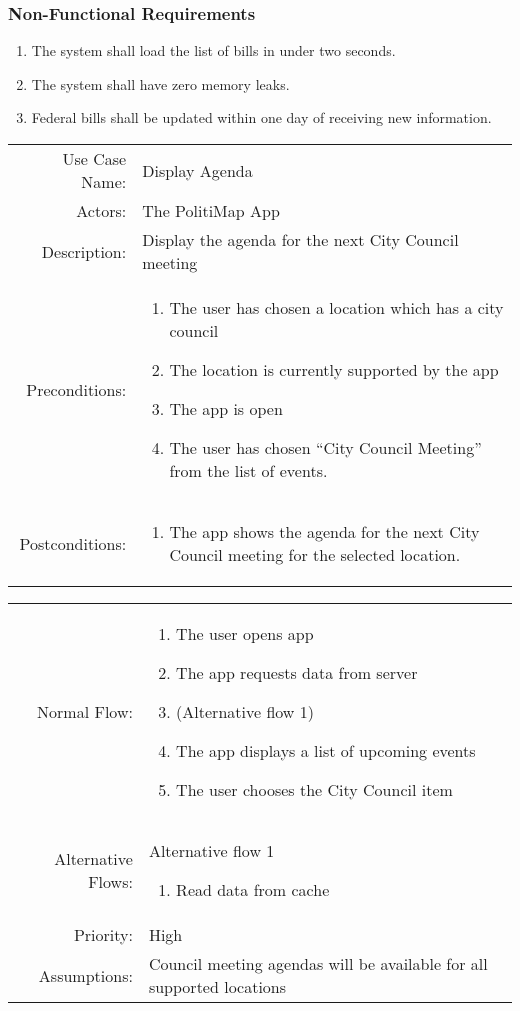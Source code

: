 \documentclass{beamer}
\begin{document}
\begin{frame}
  \frametitle{Non-Functional Requirements}
  \begin{enumerate}
    \item The system shall load the list of bills in under two seconds.
\item The system shall have zero memory leaks.
\item Federal bills shall be updated within one day of receiving new information.
  \end{enumerate}
\end{frame}

\begin{frame}
\begin{tabu}{rX}
  Use Case Name: & Display Agenda\\
  Actors: & The PolitiMap App\\
  Description: & Display the agenda for the next City Council meeting\\
  Preconditions: &
  \begin{enumerate}
  \item The user has chosen a location which has a city council
  \item The location is currently supported by the app
  \item The app is open
  \item The user has chosen ``City Council Meeting'' from the list of events.
  \end{enumerate} \\
  Postconditions: &
  \begin{enumerate}
  \item The app shows the agenda for the next City Council meeting for
    the selected location.
  \end{enumerate} \\
\end{tabu}
\end{frame}
\begin{frame}
  \begin{tabu}{rX}
  Normal Flow: &
  \begin{enumerate}
  \item The user opens app
  \item The app requests data from server
  \item (Alternative flow 1)
  \item The app displays a list of upcoming events
  \item The user chooses the City Council item
  \end{enumerate} \\
  Alternative Flows: &
  Alternative flow 1
  \begin{enumerate}
  \item Read data from cache
  \end{enumerate} \\
  Priority: & High\\
  Assumptions: & Council meeting agendas will be available for all
  supported locations\\
\end{tabu}
\end{frame}
\end{document}
